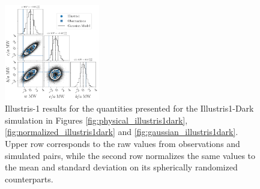 \documentclass[a4paper,fleqn,usenatbib]{mnras}
\begin{document}
\begin{figure}
\includegraphics[width=0.37\textwidth]{gaussian_model_illustris1_MW_n_11.pdf}
\caption{Illustris-1 results for the quantities presented for the Illustris1-Dark
  simulation in Figures  
\ref{fig:physical_illustris1dark}, \ref{fig:normalized_illustris1dark}
and \ref{fig:gaussian_illustris1dark}.
Upper row corresponds to the raw values from observations and
simulated pairs, while the second row normalizes the same values to
the mean and standard deviation on its spherically randomized
counterparts. 
\label{fig:all_plots_illustris1}}
\end{figure}
\end{document}
